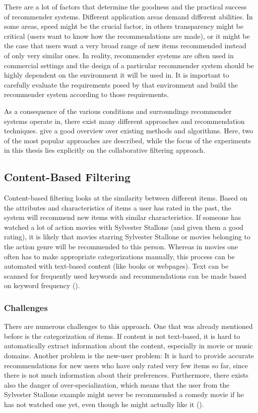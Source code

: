 There are a lot of factors that determine the goodness and the practical success of recommender systems. Different application areas demand different abilities. In some areas, speed might be the crucial factor, in others transparency might be critical (users want to know how the recommendations are made), or it might be the case that users want a very broad range of new items recommended instead of only very similar ones. In reality, recommender systems are often used in commercial settings and the design of a particular recommender system should be highly dependent on the environment it will be used in. It is important to carefully evaluate the requirements posed by that environment and build the recommender system according to those requirements.
\newline

As a consequence of the various conditions and surroundings recommender systems operate in, there exist many different approaches and recommendation techniques. \cite{Ricci_2011} give a good overview over existing methods and algorithms. Here, two of the most popular approaches are described, while the focus of the experiments in this thesis lies explicitly on the collaborative filtering approach.

\subsection{Content-Based Filtering}
\label{sst:contentbasedfiltering} Content-based filtering looks at the similarity between different items. Based on the attributes and characteristics of items a user has rated in the past, the system will recommend new items with similar characteristics. If someone has watched a lot of action movies with Sylvester Stallone (and given them a good rating), it is likely that movies starring Sylvester Stallone or movies belonging to the action genre will be recommended to this person. Whereas in movies one often has to make appropriate categorizations manually, this process can be automated with text-based content (like books or webpages). Text can be scanned for frequently used keywords and recommendations can be made based on keyword frequency (\cite{Parkes_2013}).

\subsubsection{Challenges}
\label{ssst:challenges} There are numerous challenges to this approach. One that was already mentioned before is the categorization of items. If content is not text-based, it is hard to automatically extract information about the content, especially in movie or music domains. Another problem is the new-user problem: It is hard to provide accurate recommendations for new users who have only rated very few items so far, since there is not much information about their preferences. Furthermore, there exists also the danger of over-specialization, which means that the user from the Sylvester Stallone example might never be recommended a comedy movie if he has not watched one yet, even though he might actually like it (\cite{Parkes_2013}).

